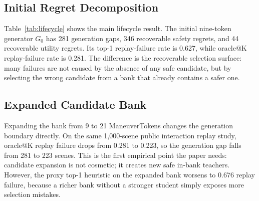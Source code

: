 \documentclass{article}
\begin{document}
\subsection{Initial Regret Decomposition}
\label{sec:exp:g0}

Table~\ref{tab:lifecycle} shows the main lifecycle result. The initial nine-token
generator $G_0$ has 281 generation gaps, 346 recoverable safety regrets, and 44
recoverable utility regrets. Its top-1 replay-failure rate is 0.627, while oracle@K
replay-failure rate is 0.281. The difference is the recoverable selection surface: many
failures are not caused by the absence of any safe candidate, but by selecting the wrong
candidate from a bank that already contains a safer one.

\begin{table}[t]
\centering
\caption{Recoverable-regret lifecycle on 1,000 interaction-aware public nuPlan scenes.
The candidate-level replay-value student closes most recoverable safety regret on one
illustrative split of a fixed bank. Candidate expansion changes the oracle boundary;
student choice determines how much of that boundary is actually exploited.}
\label{tab:lifecycle}
\footnotesize
{}
\end{table}

\subsection{Expanded Candidate Bank}
\label{sec:exp:g1}

Expanding the bank from 9 to 21 ManeuverTokens changes the generation boundary directly.
On the same 1,000-scene public interaction replay study, oracle@K replay failure drops
from 0.281 to 0.223, so the generation gap falls from 281 to 223 scenes. This is the
first empirical point the paper needs: candidate expansion is not cosmetic; it creates new
safe in-bank teachers. However, the proxy top-1 heuristic on the expanded bank worsens to
0.676 replay failure, because a richer bank without a stronger student simply exposes more
selection mistakes.
\end{document}
